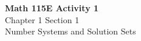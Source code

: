 \documentclass{article}
\begin{document}
\begin{center}
    \Large \textbf{Math 115E Activity 1} \\
    \vspace{0.2cm}
    \normalsize Chapter 1 Section 1 \\
    \normalsize Number Systems and Solution Sets
\end{center}
\vspace{1cm} %
\end{document}
